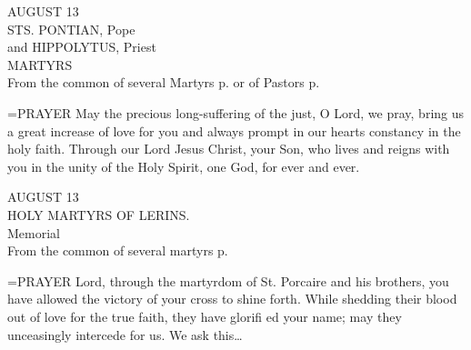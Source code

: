 \begin{center}\normalsize AUGUST 13\\
\footnotesize STS. PONTIAN, Pope\\
\footnotesize and HIPPOLYTUS, Priest\\
\footnotesize MARTYRS\\
\footnotesize From the common of several Martyrs p.    or of Pastors p. \\
\end{center}

\hangindent=\parindent \small{PRAYER 
May the precious long-suffering of the just,
O Lord, we pray,
bring us a great increase of love for you
and always prompt in our hearts
constancy in the holy faith.
Through our Lord Jesus Christ, your Son,
who lives and reigns with you in the unity of the Holy Spirit,
one God, for ever and ever.\\}
 
\begin{center}\normalsize AUGUST 13\\
\footnotesize HOLY MARTYRS OF LERINS.\\
\footnotesize Memorial\\
\footnotesize From the common of several martyrs p. \\
\end{center}

\hangindent=\parindent \small{PRAYER 
Lord, through the martyrdom of St. Porcaire and his brothers,
you have allowed the victory of your cross to shine forth. While
shedding their blood out of love for the true faith, they have glorifi ed
your name; may they unceasingly intercede for us. We ask this…\\}
 
